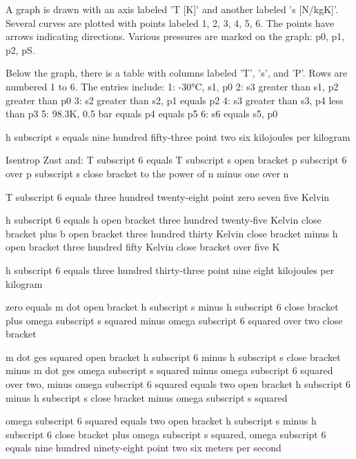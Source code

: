 A graph is drawn with an axis labeled 'T [K]' and another labeled 's [N/kgK]'. Several curves are plotted with points labeled 1, 2, 3, 4, 5, 6. The points have arrows indicating directions. Various pressures are marked on the graph: p0, p1, p2, pS. 

Below the graph, there is a table with columns labeled 'T', 's', and 'P'. Rows are numbered 1 to 6. The entries include:
1: -30°C, s1, p0
2: s3 greater than s1, p2 greater than p0
3: s2 greater than s2, p1 equals p2
4: s3 greater than s3, p4 less than p3
5: 98.3K, 0.5 bar equals p4 equals p5
6: s6 equals s5, p0

h subscript s equals nine hundred fifty-three point two six kilojoules per kilogram

Isentrop Zust and:
T subscript 6 equals T subscript s open bracket p subscript 6 over p subscript s close bracket to the power of n minus one over n

T subscript 6 equals three hundred twenty-eight point zero seven five Kelvin

h subscript 6 equals h open bracket three hundred twenty-five Kelvin close bracket plus b open bracket three hundred thirty Kelvin close bracket minus h open bracket three hundred fifty Kelvin close bracket over five K

h subscript 6 equals three hundred thirty-three point nine eight kilojoules per kilogram

zero equals m dot open bracket h subscript s minus h subscript 6 close bracket plus omega subscript s squared minus omega subscript 6 squared over two close bracket

m dot ges squared open bracket h subscript 6 minus h subscript s close bracket minus m dot ges omega subscript s squared minus omega subscript 6 squared over two, minus omega subscript 6 squared equals two open bracket h subscript 6 minus h subscript s close bracket minus omega subscript s squared

omega subscript 6 squared equals two open bracket h subscript s minus h subscript 6 close bracket plus omega subscript s squared, omega subscript 6 equals nine hundred ninety-eight point two six meters per second